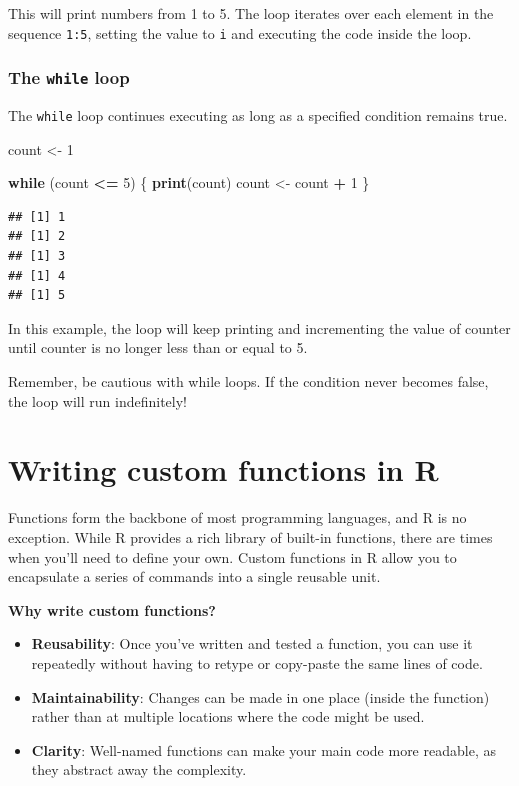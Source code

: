 \documentclass[
]{book}
\newenvironment{Shaded}{\begin{snugshade}}{\end{snugshade}}
\newcommand{\ControlFlowTok}[1]{\textcolor[rgb]{0.13,0.29,0.53}{\textbf{#1}}}
\newcommand{\DecValTok}[1]{\textcolor[rgb]{0.00,0.00,0.81}{#1}}
\newcommand{\FunctionTok}[1]{\textcolor[rgb]{0.13,0.29,0.53}{\textbf{#1}}}
\newcommand{\NormalTok}[1]{#1}
\newcommand{\OtherTok}[1]{\textcolor[rgb]{0.56,0.35,0.01}{#1}}
\newcommand{\SpecialCharTok}[1]{\textcolor[rgb]{0.81,0.36,0.00}{\textbf{#1}}}
\providecommand{\tightlist}{%
  \setlength{\itemsep}{0pt}\setlength{\parskip}{0pt}}
\begin{document}
This will print numbers from 1 to 5. The loop iterates over each element in the sequence \texttt{1:5}, setting the value to \texttt{i} and executing the code inside the loop.

\hypertarget{the-while-loop}{%
\subsubsection{\texorpdfstring{The \texttt{while} loop}{The while loop}}\label{the-while-loop}}

The \texttt{while} loop continues executing as long as a specified condition remains true.

\begin{Shaded}
\begin{Highlighting}[]
\NormalTok{count }\OtherTok{\textless{}{-}} \DecValTok{1}

\ControlFlowTok{while}\NormalTok{ (count }\SpecialCharTok{\textless{}=} \DecValTok{5}\NormalTok{) \{}
  \FunctionTok{print}\NormalTok{(count)}
\NormalTok{  count }\OtherTok{\textless{}{-}}\NormalTok{ count }\SpecialCharTok{+} \DecValTok{1}
\NormalTok{\}}
\end{Highlighting}
\end{Shaded}

\begin{verbatim}
## [1] 1
## [1] 2
## [1] 3
## [1] 4
## [1] 5
\end{verbatim}

In this example, the loop will keep printing and incrementing the value of counter until counter is no longer less than or equal to 5.

Remember, be cautious with while loops. If the condition never becomes false, the loop will run indefinitely!

\hypertarget{writing-custom-functions-in-r}{%
\section{Writing custom functions in R}\label{writing-custom-functions-in-r}}

Functions form the backbone of most programming languages, and R is no exception. While R provides a rich library of built-in functions, there are times when you'll need to define your own. Custom functions in R allow you to encapsulate a series of commands into a single reusable unit.

\textbf{Why write custom functions?}

\begin{itemize}
\tightlist
\item
  \textbf{Reusability}: Once you've written and tested a function, you can use it repeatedly without having to retype or copy-paste the same lines of code.
\item
  \textbf{Maintainability}: Changes can be made in one place (inside the function) rather than at multiple locations where the code might be used.
\item
  \textbf{Clarity}: Well-named functions can make your main code more readable, as they abstract away the complexity.
\end{itemize}
\end{document}
